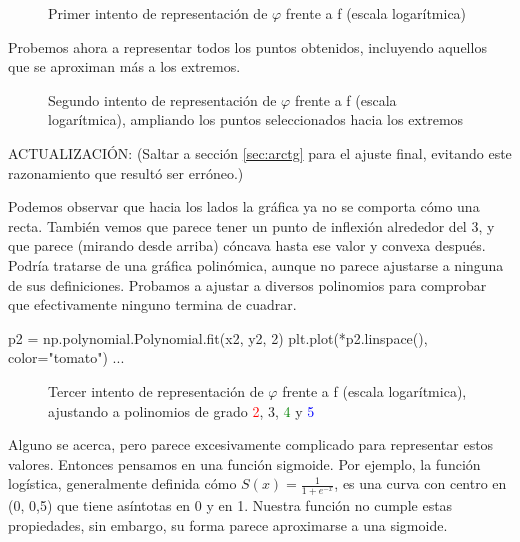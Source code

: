 \documentclass[12pt, a4paper, titlepage]{article}
\begin{document}
  \begin{figure}[H]
    \hspace{2.5em} 
    \caption{Primer intento de representación de $\varphi$ frente a f (escala logarítmica)}
  \end{figure}

  Probemos ahora a representar todos los puntos obtenidos, incluyendo aquellos que se aproximan más a los extremos.

  \begin{figure}[H]
    \hspace{2.5em} 
    \caption{Segundo intento de representación de $\varphi$ frente a f (escala logarítmica), ampliando los puntos seleccionados hacia los extremos}
  \end{figure}

  ACTUALIZACIÓN: (Saltar a sección \ref{sec:arctg} para el ajuste final, evitando este razonamiento que resultó ser erróneo.)

  Podemos observar que hacia los lados la gráfica ya no se comporta cómo una recta. También vemos que parece tener un punto de inflexión alrededor del 3, y que parece (mirando desde arriba) cóncava hasta ese valor y convexa después. Podría tratarse de una gráfica polinómica, aunque no parece ajustarse a ninguna de sus definiciones. Probamos a ajustar a diversos polinomios para comprobar que efectivamente ninguno termina de cuadrar.

  \begin{python}
    p2 = np.polynomial.Polynomial.fit(x2, y2, 2)
    plt.plot(*p2.linspace(), color="tomato")
    ...
  \end{python}

  \begin{figure}[H]
    \hspace{2.5em} 
    \caption{Tercer intento de representación de $\varphi$ frente a f (escala logarítmica), ajustando a polinomios de grado \textcolor{Red}{2}, \textcolor{Golden}{3}, \textcolor{Green}{4} y \textcolor{Blue}{5}}
  \end{figure}

  Alguno se acerca, pero parece excesivamente complicado para representar estos valores. Entonces pensamos en una función sigmoide. Por ejemplo, la función logística, generalmente definida cómo $S(x) = \frac{1}{1+e^{-x}}$, es una curva con centro en (0, 0,5) que tiene asíntotas en 0 y en 1. Nuestra función no cumple estas propiedades, sin embargo, su forma parece aproximarse a una sigmoide.
\end{document}
